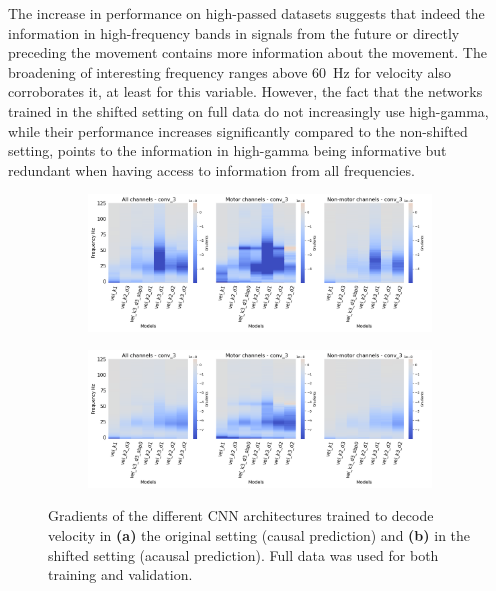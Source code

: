 \begin{enumerate}
    The increase in performance on high-passed datasets suggests that indeed the information in high-frequency bands in signals from the future or directly preceding the movement contains more information about the movement.
    The broadening of interesting frequency ranges above 60~Hz for velocity also corroborates it, at least for this variable. 
    However, the fact that the networks trained in the shifted setting on full data do not increasingly use high-gamma, while their performance increases significantly compared to the non-shifted setting, points to the information in high-gamma being informative but redundant when having access to information from all frequencies.
\end{enumerate}

\begin{figure}[!htpb]
\centering
\RawFloats
\begin{subfigure}[b]{\textwidth}
   \includegraphics[width=1\linewidth]{img/ch4/vel-conv-3-layer-grads}
   \caption{}
   \label{fig:vel-conv3-layer-grads}
\end{subfigure}

\begin{subfigure}[b]{\textwidth}
   \includegraphics[width=1\linewidth]{img/ch4/vel-conv-3-layer-grads-shifted}
   \caption{}
   \label{fig:vel-conv3-layer-grads-shifted}
\end{subfigure}
\caption[Velocity: non-shifted vs. shifted gradient, full data]{Gradients of the different CNN architectures trained to decode velocity in \textbf{(a)} the original setting (causal prediction) and \textbf{(b)} in the shifted setting (acausal prediction). Full data was used for both training and validation.}
\label{fig:vel-shifted-vs-non-shifted-grads}
\end{figure}

